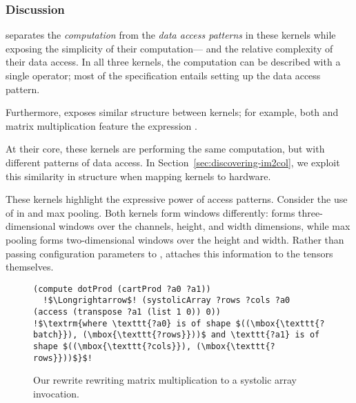   
\subsubsection*{Discussion}\label{section:kernel-implementation-discussion}

\g separates
  the \textit{computation}
  from the \textit{data access patterns}
  in these kernels while exposing
  the simplicity of their computation---%
  and the relative complexity
  of their data access.
In all three kernels,
  the computation can be described
  with a single operator;
  most of the specification
  entails
  setting up the data access pattern.

Furthermore,
  \g exposes similar structure
  between kernels;
  for example,
  both \ctd
  and matrix multiplication
  feature the expression
  .
  
At their core, these kernels
  are performing the same computation,
  but with different patterns
  of data access.
In Section~\ref{sec:discovering-im2col},
  we exploit this similarity in structure
  when mapping kernels to hardware.
  
These kernels highlight the expressive power
  of access patterns.
Consider the use of 
  in \ctd
   and max pooling.
Both kernels
  form windows
  differently:
  \ctd forms three-dimensional
  windows
  over the channels, height, and width
  dimensions,
  while max pooling forms two-dimensional windows
  over the height and width.
Rather than passing configuration parameters to ,
  \g attaches this information to the tensors themselves.
  
  
\begin{figure}
\begin{lstlisting}[escapechar=!]
(compute dotProd (cartProd ?a0 ?a1)) 
  !$\Longrightarrow$! (systolicArray ?rows ?cols ?a0 (access (transpose ?a1 (list 1 0)) 0))
!$\textrm{where \texttt{?a0} is of shape $((\mbox{\texttt{?batch}}), (\mbox{\texttt{?rows}}))$ and \texttt{?a1} is of shape $((\mbox{\texttt{?cols}}), (\mbox{\texttt{?rows}}))$}$!
\end{lstlisting}
\caption{Our rewrite rewriting matrix multiplication to a systolic array invocation.}
    \label{fig:systolic-array-rewrite}
\end{figure}
  
